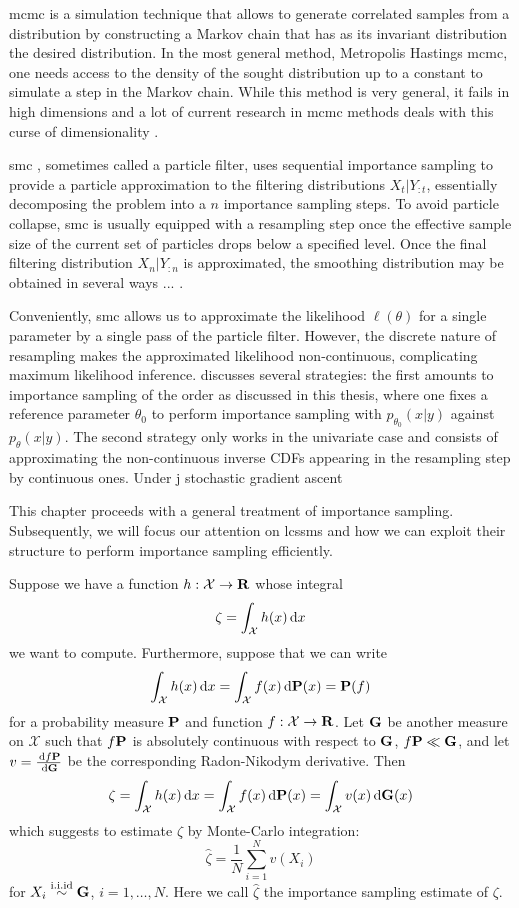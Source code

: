 \gls{mcmc} is a simulation technique that allows to generate correlated samples from a distribution by constructing a Markov chain that has as its invariant distribution the desired distribution. In the most general method, Metropolis Hastings \gls{mcmc}, one needs access to the density of the sought distribution up to a constant to simulate a step in the Markov chain. While this method is very general, it fails in high dimensions and a lot of current research in \gls{mcmc} methods deals with this  curse of dimensionality . 


\gls{smc} \cite{Chopin2020Introduction}, sometimes called a particle filter, uses sequential importance sampling to provide a particle approximation to the filtering distributions $X_{t} | Y_{:t}$, essentially decomposing the problem into a $n$ importance sampling steps. 
To avoid particle collapse, \gls{smc} is usually equipped with a resampling step once the effective sample size of the current set of particles drops below a specified level. Once the final filtering distribution $X_{n}|Y_{:n}$ is approximated, the smoothing distribution may be obtained in several ways ... .

Conveniently, \gls{smc} allows us to approximate the likelihood $\ell(\theta)$ for a single parameter by a single pass of the particle filter. However, the discrete nature of resampling makes the approximated likelihood non-continuous, complicating maximum likelihood inference. \cite[Chapter 14.3]{Chopin2020Introduction} discusses several strategies: the first amounts to importance sampling of the order as discussed in this thesis, where one fixes a reference parameter $\theta_{0}$ to perform importance sampling with $p_{\theta_{0}}(x|y)$ against $p_{\theta}(x|y)$. The second strategy only works in the univariate case and consists of approximating the non-continuous inverse CDFs appearing in the resampling step by continuous ones. Under j stochastic gradient ascent  

This chapter proceeds with a general treatment of importance sampling. Subsequently, we will focus our attention on \glspl{lcssm} and how we can exploit their structure to perform importance sampling efficiently. 

Suppose we have a function $h: \mathcal X \to \R$ whose integral $$\zeta = \int_{\mathcal X} h(x) \d x$$ we want to compute.
Furthermore, suppose that we can write
$$
    \int_{\mathcal X} h(x) \d x = \int_{\mathcal X} f(x) \d \P(x) = \P (f)
$$
for a probability measure $\P$ and function $f: \mathcal X \to \R$.
Let $\G$ be another measure on $\mathcal X$ such that $f\P$ is absolutely continuous with respect to $\G$, $f\P \ll \G$, and let $v = \frac{\d f\P}{\d\G}$ be the corresponding Radon-Nikodym derivative. Then
$$
    \zeta = \int_{\mathcal X} h(x) \d x = \int_{\mathcal X} f(x) \d \P(x) = \int_{\mathcal X} v(x)\d\G(x)
$$
which suggests to estimate $\zeta$ by Monte-Carlo integration: $$\hat \zeta = \frac 1 N \sum_{i=1}^{N} v(X_i)$$ for $X_i \iid \G$, $i = 1, \dots, N$. Here we call $\hat \zeta$ the importance sampling estimate of $\zeta$.

